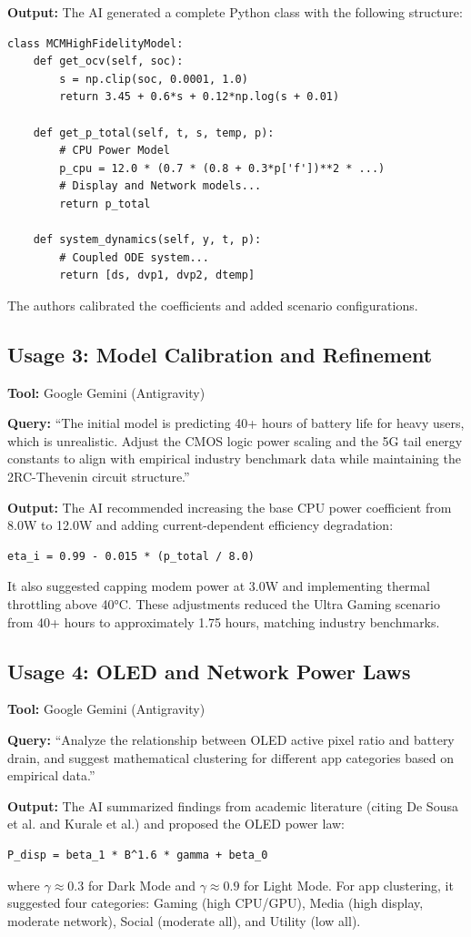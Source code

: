 \documentclass[12pt]{article}
\begin{document}
\textbf{Output:} The AI generated a complete Python class with the following structure:
\begin{verbatim}
class MCMHighFidelityModel:
    def get_ocv(self, soc):
        s = np.clip(soc, 0.0001, 1.0)
        return 3.45 + 0.6*s + 0.12*np.log(s + 0.01)
    
    def get_p_total(self, t, s, temp, p):
        # CPU Power Model
        p_cpu = 12.0 * (0.7 * (0.8 + 0.3*p['f'])**2 * ...)
        # Display and Network models...
        return p_total
    
    def system_dynamics(self, y, t, p):
        # Coupled ODE system...
        return [ds, dvp1, dvp2, dtemp]
\end{verbatim}
The authors calibrated the coefficients and added scenario configurations.

\subsection*{Usage 3: Model Calibration and Refinement}
\textbf{Tool:} Google Gemini (Antigravity)

\textbf{Query:} ``The initial model is predicting 40+ hours of battery life for heavy users, which is unrealistic. Adjust the CMOS logic power scaling and the 5G tail energy constants to align with empirical industry benchmark data while maintaining the 2RC-Thevenin circuit structure.''

\textbf{Output:} The AI recommended increasing the base CPU power coefficient from 8.0W to 12.0W and adding current-dependent efficiency degradation:
\begin{verbatim}
eta_i = 0.99 - 0.015 * (p_total / 8.0)
\end{verbatim}
It also suggested capping modem power at 3.0W and implementing thermal throttling above 40°C. These adjustments reduced the Ultra Gaming scenario from 40+ hours to approximately 1.75 hours, matching industry benchmarks.

\subsection*{Usage 4: OLED and Network Power Laws}
\textbf{Tool:} Google Gemini (Antigravity)

\textbf{Query:} ``Analyze the relationship between OLED active pixel ratio and battery drain, and suggest mathematical clustering for different app categories based on empirical data.''

\textbf{Output:} The AI summarized findings from academic literature (citing De Sousa et al. and Kurale et al.) and proposed the OLED power law:
\begin{verbatim}
P_disp = beta_1 * B^1.6 * gamma + beta_0
\end{verbatim}
where $\gamma \approx 0.3$ for Dark Mode and $\gamma \approx 0.9$ for Light Mode. For app clustering, it suggested four categories: Gaming (high CPU/GPU), Media (high display, moderate network), Social (moderate all), and Utility (low all).
\end{document}
